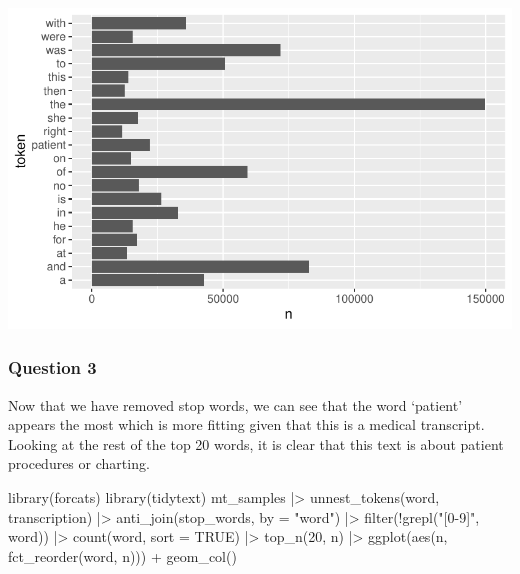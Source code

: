\documentclass[
  letterpaper,
  DIV=11,
  numbers=noendperiod]{scrartcl}
\newenvironment{Shaded}{\begin{snugshade}}{\end{snugshade}}
\newcommand{\AttributeTok}[1]{\textcolor[rgb]{0.40,0.45,0.13}{#1}}
\newcommand{\ConstantTok}[1]{\textcolor[rgb]{0.56,0.35,0.01}{#1}}
\newcommand{\DecValTok}[1]{\textcolor[rgb]{0.68,0.00,0.00}{#1}}
\newcommand{\FunctionTok}[1]{\textcolor[rgb]{0.28,0.35,0.67}{#1}}
\newcommand{\NormalTok}[1]{\textcolor[rgb]{0.00,0.23,0.31}{#1}}
\newcommand{\SpecialCharTok}[1]{\textcolor[rgb]{0.37,0.37,0.37}{#1}}
\newcommand{\StringTok}[1]{\textcolor[rgb]{0.13,0.47,0.30}{#1}}
\begin{document}
\includegraphics{Lab-6_files/figure-pdf/unnamed-chunk-3-1.pdf}

\subsubsection{Question 3}\label{question-3}

Now that we have removed stop words, we can see that the word `patient'
appears the most which is more fitting given that this is a medical
transcript. Looking at the rest of the top 20 words, it is clear that
this text is about patient procedures or charting.

\begin{Shaded}
\begin{Highlighting}[]
\FunctionTok{library}\NormalTok{(forcats)}
\FunctionTok{library}\NormalTok{(tidytext)}
\NormalTok{mt\_samples }\SpecialCharTok{|\textgreater{}} 
  \FunctionTok{unnest\_tokens}\NormalTok{(word, transcription) }\SpecialCharTok{|\textgreater{}}           
  \FunctionTok{anti\_join}\NormalTok{(stop\_words, }\AttributeTok{by =} \StringTok{"word"}\NormalTok{) }\SpecialCharTok{|\textgreater{}}             
  \FunctionTok{filter}\NormalTok{(}\SpecialCharTok{!}\FunctionTok{grepl}\NormalTok{(}\StringTok{"[0{-}9]"}\NormalTok{, word)) }\SpecialCharTok{|\textgreater{}}                   
  \FunctionTok{count}\NormalTok{(word, }\AttributeTok{sort =} \ConstantTok{TRUE}\NormalTok{) }\SpecialCharTok{|\textgreater{}}                        
  \FunctionTok{top\_n}\NormalTok{(}\DecValTok{20}\NormalTok{, n) }\SpecialCharTok{|\textgreater{}}                                    
  \FunctionTok{ggplot}\NormalTok{(}\FunctionTok{aes}\NormalTok{(n, }\FunctionTok{fct\_reorder}\NormalTok{(word, n))) }\SpecialCharTok{+}
  \FunctionTok{geom\_col}\NormalTok{()}
\end{Highlighting}
\end{Shaded}
\end{document}
